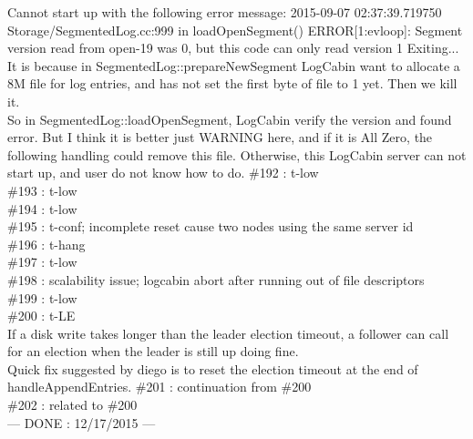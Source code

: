 Cannot start up with the following error message: 
2015-09-07 02:37:39.719750 Storage/SegmentedLog.cc:999 in 
loadOpenSegment() ERROR[1:evloop]: Segment version read from 
open-19 was 0, but this code can only read version 1 Exiting...\\
It is because in SegmentedLog::prepareNewSegment LogCabin want 
to allocate a 8M file for log entries, and has not set the first 
byte of file to 1 yet. Then we kill it. \\
So in SegmentedLog::loadOpenSegment, LogCabin verify the version 
and found error. But I think it is better just WARNING here, and 
if it is All Zero, the following handling could remove this file. 
Otherwise, this LogCabin server can not start up, and user do not 
know how to do.
\#192 : t-low\\
\#193 : t-low\\
\#194 : t-low\\
\#195 : t-conf; incomplete reset cause two nodes using the same server id\\
\#196 : t-hang\\
\#197 : t-low\\
\#198 : scalability issue; logcabin abort after running out of file descriptors\\
\#199 : t-low\\
\#200 : t-LE\\
If a disk write takes longer than the leader election timeout, a follower 
can call for an election when the leader is still up doing fine.\\
Quick fix suggested by diego is to reset the election timeout at the 
end of handleAppendEntries.
\#201 : continuation from \#200\\
\#202 : related to \#200\\
--- DONE : 12/17/2015 ---